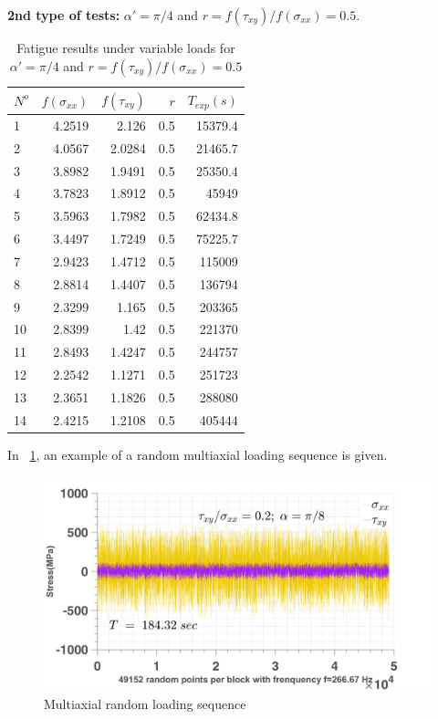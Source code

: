 \documentclass[3p,times,procedia,number]{elsarticle}
\newcommand{\figref}[1]{\figurename~\ref{#1}}
\begin{document}
\textbf{2nd type of tests:} $\alpha' = \pi / 4$ and $r =f(\tau_{xy})/f(\sigma_{xx})=0.5$.

\begin{table}[]
	\centering
	\begin{tabular}{lrrrr}
		\hline
		$N^o$ & $f(\sigma_{xx})$ & $f(\tau_{xy})$ & $r$   & $T_{exp}(s)$ \\ \hline
		1   & 4.2519                  & 2.126   & 0.5 & 15379.4    \\
		2   & 4.0567                  & 2.0284  & 0.5 & 21465.7    \\
		3   & 3.8982                  & 1.9491  & 0.5 & 25350.4    \\
		4   & 3.7823                  & 1.8912  & 0.5 & 45949      \\
		5   & 3.5963                  & 1.7982  & 0.5 & 62434.8    \\
		6   & 3.4497                  & 1.7249  & 0.5 & 75225.7    \\
		7   & 2.9423                  & 1.4712  & 0.5 & 115009     \\
		8   & 2.8814                  & 1.4407  & 0.5 & 136794     \\
		9   & 2.3299                  & 1.165   & 0.5 & 203365     \\
		10  & 2.8399                  & 1.42    & 0.5 & 221370     \\
		11  & 2.8493                  & 1.4247  & 0.5 & 244757     \\
		12  & 2.2542                  & 1.1271  & 0.5 & 251723     \\
		13  & 2.3651                  & 1.1826  & 0.5 & 288080     \\
		14  & 2.4215                  & 1.2108  & 0.5 & 405444     \\ \hline
	\end{tabular}
	\caption{Fatigue results under variable loads for $\alpha' = \pi / 4$ and $r =f(\tau_{xy})/f(\sigma_{xx})=0.5$}
	\label{tab.10HNAPrand2}
\end{table}

In \figref{fig.10HNAP2Drandom}, an example of a random multiaxial loading sequence is given.
\begin{figure}[!h]
	\centering
	\includegraphics[width=\textwidth]{figures//HNAP_random.png} 
	\caption{Multiaxial random loading sequence}
	\label{fig.10HNAP2Drandom}
\end{figure}
\end{document}
